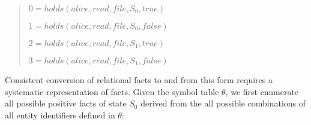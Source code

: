 \documentclass[10pt, twocolumn]{article}
\begin{document}
          \begin{quote}
            $0 = holds(alice, read, file, S_{0}, true)$

            $1 = holds(alice, read, file, S_{0}, false)$

            $2 = holds(alice, read, file, S_{1}, true)$

            $3 = holds(alice, read, file, S_{1}, false)$
          \end{quote}

          Consistent conversion of relational facts to and from this form
          requires a systematic representation of facts. Given the symbol table
          $\theta$, we first enumerate all possible positive facts of state
          $S_{0}$ derived from the all possible combinations of all entity
          identifiers defined in $\theta$:
\end{document}
